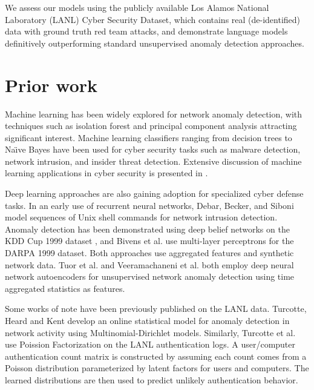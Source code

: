 \documentclass[letterpaper]{article} %
\begin{document}
 We assess our models using the publicly available Los Alamos National Laboratory (LANL) Cyber Security Dataset, 
which contains real (de-identified) data with ground truth red team attacks, and demonstrate 
 language models definitively outperforming standard unsupervised anomaly detection approaches.

\section{Prior work} 

Machine learning has been widely explored for network anomaly detection, 
with techniques such as isolation forest \cite{gavai2015supervised,LiuTingZhou08} 
and principal component analysis \cite{novakov2013studies,Ringberg2007SensitivityOP} attracting significant interest. 
Machine learning classifiers ranging from decision trees to Na\"{\i}ve Bayes have been used for cyber security tasks such as malware detection, network intrusion, and insider threat detection. 
Extensive discussion of machine learning applications in cyber security is presented in 
\cite{bhattacharyya2013network,buczak2016survey,dua2016data,kumar2010use,zuech2015intrusion,rubin2016anomaly}.

Deep learning approaches are also gaining adoption for specialized cyber defense tasks. 
In an early use of recurrent neural networks, Debar, Becker, and Siboni  model sequences of Unix shell commands for network intrusion detection.
Anomaly detection has been demonstrated using deep belief networks on the KDD Cup 1999 dataset \cite{alrawashdeh2016toward}, 
and Bivens et al.  use multi-layer perceptrons for the DARPA 1999 dataset. 
Both approaches use aggregated features and synthetic network data.
 Tuor et al.  and Veeramachaneni et al.  both employ deep neural network autoencoders for unsupervised network anomaly detection using time aggregated statistics as features.
  
Some works of note have been previously published on the LANL data. 
Turcotte, Heard and Kent  develop an online statistical model for anomaly detection in network activity using Multinomial-Dirichlet models. 
Similarly, Turcotte et al.  use Poission Factorization \cite{gopalan2013scalable} on the LANL authentication logs. 
A user/computer authentication count matrix is constructed by assuming each count comes from a Poisson distribution parameterized by latent factors for users and computers. 
The learned distributions are then used to predict unlikely authentication behavior. 
\end{document}
